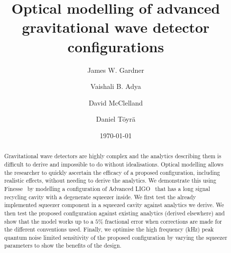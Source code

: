 \documentclass[aps,pra,superscriptaddress,reprint,nofootinbib]{revtex4-1}
\begin{document}
\title{Optical modelling of advanced gravitational wave detector configurations}

\author{James W. Gardner}

\author{Vaishali B. Adya}

\author{David McClelland}

\author{Daniel Töyrä}

\date{\today}


\begin{abstract}

Gravitational wave detectors are highly complex and the analytics describing them is difficult to derive and impossible to do without idealisations. Optical modelling allows the researcher to quickly ascertain the efficacy of a proposed configuration, including realistic effects, without needing to derive the analytics. We demonstrate this using Finesse~\cite{finesse} by modelling a configuration of Advanced LIGO~\cite{AdvancedLIGO:2015} that has a long signal recycling cavity with a degenerate squeezer inside. We first test the already implemented squeezer component in a squeezed cavity against analytics we derive. We then test the proposed configuration against existing analytics (derived elsewhere) and show that the model works up to a $5\%$ fractional error when corrections are made for the different conventions used. Finally, we optimise the high frequency (kHz) peak quantum noise limited sensitivity of the proposed configuration by varying the squeezer parameters to show the benefits of the design.

\end{abstract}
\end{document}
